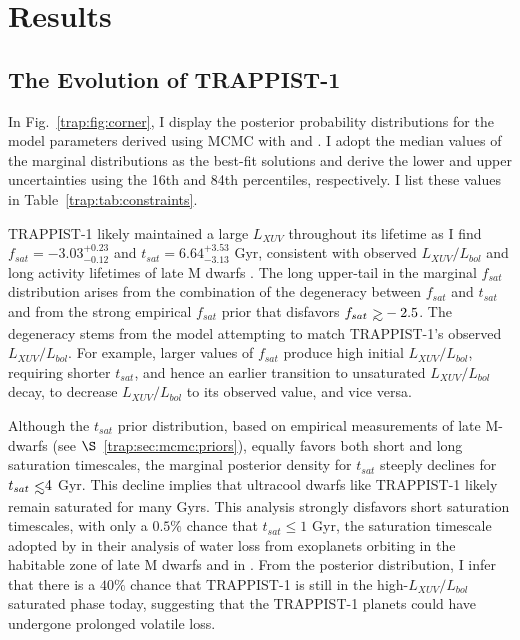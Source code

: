 
\section{Results} \label{trap:sec:results}

\subsection{The Evolution of TRAPPIST-1}

In Fig.~\ref{trap:fig:corner}, I display the posterior probability distributions for the model parameters derived using MCMC with \vplanet and \emcee. I adopt the median values of the marginal distributions as the best-fit solutions and derive the lower and upper uncertainties using the 16th and 84th percentiles, respectively. I list these values in Table~\ref{trap:tab:constraints}.

TRAPPIST-1 likely maintained a large $L_{XUV}$ throughout its lifetime as I find $f_{sat} = -3.03^{+0.23}_{-0.12}$ and $t_{sat} = 6.64^{+3.53}_{-3.13}$ Gyr, consistent with observed $L_{XUV}/L_{bol}$ and long activity lifetimes of late M dwarfs \citep{West2008,Wright2018}. The long upper-tail in the marginal $f_{sat}$ distribution arises from the combination of the degeneracy between $f_{sat}$ and $t_{sat}$ and from the strong empirical $f_{sat}$ prior that disfavors $f_{sat} \gsim -2.5$. The degeneracy stems from the model attempting to match TRAPPIST-1's observed $L_{XUV}/L_{bol}$. For example, larger values of $f_{sat}$ produce high initial $L_{XUV}/L_{bol}$, requiring shorter $t_{sat}$, and hence an earlier transition to unsaturated $L_{XUV}/L_{bol}$ decay, to decrease $L_{XUV}/L_{bol}$ to its observed value, and vice versa. 

Although the $t_{sat}$ prior distribution, based on empirical measurements of late M-dwarfs (see $\S$~\ref{trap:sec:mcmc:priors}), equally favors both short and long saturation timescales, the marginal posterior density for $t_{sat}$ steeply declines for $t_{sat} \lsim 4$ Gyr. This decline implies that ultracool dwarfs like TRAPPIST-1 likely remain saturated for many Gyrs. This analysis strongly disfavors short saturation timescales, with only a $0.5\%$ chance that $t_{sat} \leq 1$ Gyr, the saturation timescale adopted by \citet{Luger2015} in their analysis of water loss from exoplanets orbiting in the habitable zone of late M dwarfs and in \citet{Lincowski2018}. From the posterior distribution, I infer that there is a $40\%$ chance that TRAPPIST-1 is still in the high-$L_{XUV}/L_{bol}$ saturated phase today, suggesting that the TRAPPIST-1 planets could have undergone prolonged volatile loss.

